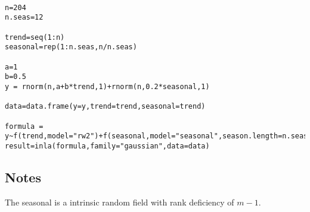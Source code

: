 \documentclass[a4paper,11pt]{article}
\begin{document}
\begin{verbatim}

n=204
n.seas=12

trend=seq(1:n)
seasonal=rep(1:n.seas,n/n.seas)

a=1
b=0.5
y = rnorm(n,a+b*trend,1)+rnorm(n,0.2*seasonal,1)

data=data.frame(y=y,trend=trend,seasonal=trend)

formula = y~f(trend,model="rw2")+f(seasonal,model="seasonal",season.length=n.seas,param=c(1,0.1))
result=inla(formula,family="gaussian",data=data)

\end{verbatim}


\subsection*{Notes}

The seasonal is a intrinsic random field with rank deficiency of $m-1$.
\end{document}
